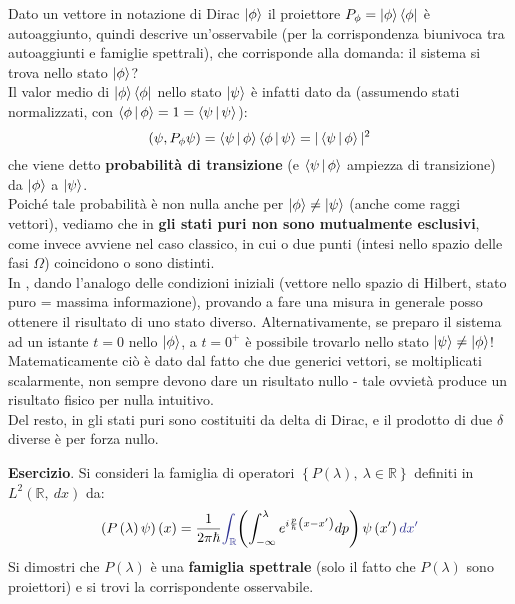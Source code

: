 \documentclass[../../FisicaTeorica.tex]{subfiles}
\begin{document}
\begin{oss}
Dato un vettore in notazione di Dirac $\Ket{\phi}$ il proiettore $P_\phi =\Ket{\phi}\Bra{\phi}$ è autoaggiunto, quindi descrive un'osservabile (per la corrispondenza biunivoca tra autoaggiunti e famiglie spettrali), che corrisponde alla domanda: il sistema si trova nello stato $\Ket{\phi}$?\\
Il valor medio di $\Ket{\phi}\Bra{\phi}$ nello stato $\Ket{\psi}$ è infatti dato da (assumendo stati normalizzati, con $\Braket{\phi|\phi} = 1 = \Braket{\psi|\psi}$):
\[
(\psi, P_\phi \psi) = 
\Braket{\psi|\phi}\Braket{\phi|\psi} = |\Braket{\psi|\phi}|^2
\]
che viene detto \textbf{probabilità di transizione} (e $\Braket{\psi|\phi}$ ampiezza di transizione) da $\Ket{\phi}$ a $\Ket{\psi}$.\\
Poiché tale probabilità è non nulla anche per $\Ket{\phi}\neq\Ket{\psi}$ (anche come raggi vettori), vediamo che in \MQ \textbf{gli stati puri non sono mutualmente esclusivi}, come invece avviene nel caso classico, in cui o due punti (intesi nello spazio delle fasi $\Omega$) coincidono o sono distinti.\\
In \MQ, dando l'analogo delle condizioni iniziali (vettore nello spazio di Hilbert, stato puro = massima informazione), provando a fare una misura in generale posso ottenere il risultato di uno stato diverso. Alternativamente, se preparo il sistema ad un istante $t=0$ nello $\Ket{\phi}$, a $t=0^+$ è possibile trovarlo nello stato $\Ket{\psi}\neq\Ket{\phi}$!\\
Matematicamente ciò è dato dal fatto che due generici vettori, se moltiplicati scalarmente, non sempre devono dare un risultato nullo - tale ovvietà produce un risultato fisico per nulla intuitivo.\\
Del resto, in \MC gli stati puri sono costituiti da delta di Dirac, e il prodotto di due $\delta$ diverse è per forza nullo.
\end{oss}
\textbf{Esercizio}.  Si consideri la famiglia di operatori $\left\{P\left(\lambda\right),\ \lambda\in\mathbb{R}\right\}$ definiti in $L^2\left(\mathbb{R},\ dx\right)$ da:
\[
\left(P\left(\lambda\right)\psi\right)\left(x\right)=\frac{1}{2\pi\hbar}\textcolor{Blue}{\int_{\mathbb{R}}}{\left(\int_{-\infty}^{\lambda}e^{i\frac{p}{\hbar}\left(x-x'\right)}dp\right)\psi\left(x'\right)\textcolor{Blue}{dx'}}
\]
Si dimostri che $P\left(\lambda\right)$ è una \textbf{famiglia spettrale} (solo il fatto che $P\left(\lambda\right)$ sono proiettori) e si trovi la corrispondente osservabile.\\
\end{document}
